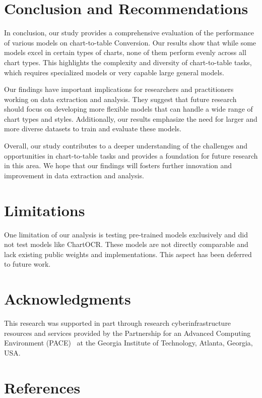 \documentclass[
	letterpaper, %
]{jdf}
\begin{document}
\section{Conclusion and Recommendations}\label{sect:conclusion}
In conclusion, our study provides a comprehensive evaluation of the performance of various models on chart-to-table Conversion.
Our results show that while some models excel in certain types of charts, none of them perform evenly across all chart types.
This highlights the complexity and diversity of chart-to-table tasks, which requires specialized models or very capable large general models.

Our findings have important implications for researchers and practitioners working on data extraction and analysis.
They suggest that future research should focus on developing more flexible models that can handle a wide range  of chart types and styles.
Additionally, our results emphasize the need for larger and more diverse datasets to train and evaluate these models.

Overall, our study contributes to a deeper understanding of the challenges and opportunities in chart-to-table tasks and provides a foundation for future research in this area. 
We hope that our findings will fosters further innovation and improvement in data extraction and analysis.

\section{Limitations}\label{sect:limitations}
One limitation of our analysis is testing pre-trained models exclusively and did not test models like ChartOCR.
These models are not directly comparable and lack existing public weights and implementations.
This aspect has been deferred to future work.

\section{Acknowledgments}
This research was supported in part through research cyberinfrastructure resources and services provided by the Partnership for an Advanced Computing Environment (PACE)~\cite{pace2017partnership} at the Georgia Institute of Technology, Atlanta, Georgia, USA.

\section{References}
\printbibliography[heading=none]
\end{document}
